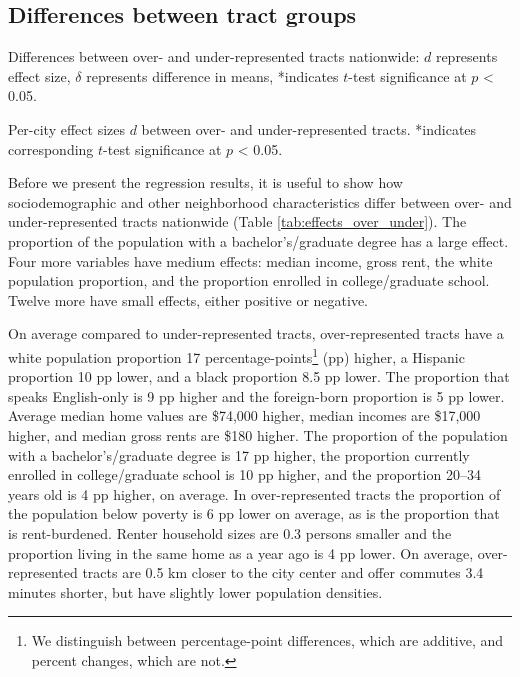 \documentclass[12pt,onecolumn]{article} %
\begin{document}
\subsection{Differences between tract groups}

\begin{table*}[htbp]
	\centering
	\small
	\caption{Differences between over- and under-represented tracts nationwide: $d$ represents effect size, $\delta$ represents difference in means, *indicates $t$-test significance at $p$ < 0.05.}
	\label{tab:effects_over_under}
	
\end{table*}

\begin{table*}[htbp]
	\scriptsize
	\centering
	\caption{Per-city effect sizes $d$ between over- and under-represented tracts. *indicates corresponding $t$-test significance at $p$ < 0.05.}
	\label{tab:effects_cities}
	
\end{table*}

Before we present the regression results, it is useful to show how sociodemographic and other neighborhood characteristics differ between over- and under-represented tracts nationwide (Table \ref{tab:effects_over_under}). The proportion of the population with a bachelor's/graduate degree has a large effect. Four more variables have medium effects: median income, gross rent, the white population proportion, and the proportion enrolled in college/graduate school. Twelve more have small effects, either positive or negative.

On average compared to under-represented tracts, over-represented tracts have a white population proportion 17 percentage-points\footnote{We distinguish between percentage-point differences, which are additive, and percent changes, which are not.} (pp) higher, a Hispanic proportion 10 pp lower, and a black proportion 8.5 pp lower. The proportion that speaks English-only is 9 pp higher and the foreign-born proportion is 5 pp lower. Average median home values are \$74,000 higher, median incomes are \$17,000 higher, and median gross rents are \$180 higher. The proportion of the population with a bachelor's/graduate degree is 17 pp higher, the proportion currently enrolled in college/graduate school is 10 pp higher, and the proportion 20--34 years old is 4 pp higher, on average. In over-represented tracts the proportion of the population below poverty is 6 pp lower on average, as is the proportion that is rent-burdened. Renter household sizes are 0.3 persons smaller and the proportion living in the same home as a year ago is 4 pp lower. On average, over-represented tracts are 0.5 km closer to the city center and offer commutes 3.4 minutes shorter, but have slightly lower population densities.
\end{document}
